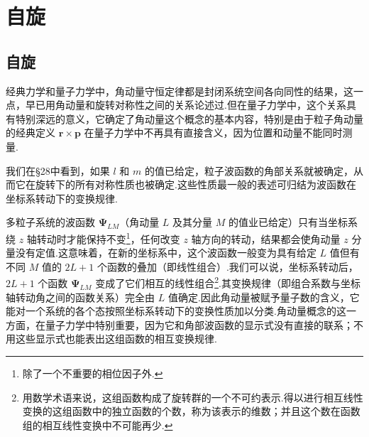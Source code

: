 %
\chapter{自旋}

\section{自旋}

经典力学和量子力学中，角动量守恒定律都是封闭系统空间各向同性的结果，这一点，早已用角动量和旋转对称性之间的关系论述过.但在量子力学中，这个关系具有特别深远的意义，它确定了角动量这个概念的基本内容，特别是由于粒子角动量的经典定义 $\boldsymbol{r}\times\boldsymbol{p}$ 在量子力学中不再具有直接含义，因为位置和动量不能同时测量.

我们在§28中看到，如果 $l$ 和 $m$ 的值已给定，粒子波函数的角部关系就被确定，从而它在旋转下的所有对称性质也被确定.这些性质最一般的表述可归结为波函数在坐标系转动下的变换规律.

多粒子系统的波函数 $\boldsymbol{\Psi}_{LM}$（角动量 $L$ 及其分量 $M$ 的值业已给定）只有当坐标系绕 $z$ 轴转动时才能保持不变\footnote{除了一个不重要的相位因子外.}，任何改变 $z$ 轴方向的转动，结果都会使角动量 $z$ 分量没有定值.这意味着，在新的坐标系中，这个波函数一般变为具有给定 $L$ 值但有不同 $M$ 值的 $2L+1$ 个函数的叠加（即线性组合）.我们可以说，坐标系转动后，$2L+1$ 个函数 $\boldsymbol{\Psi}_{LM}$ 变成了它们相互的线性组合\footnote{用数学术语来说，这组函数构成了旋转群的一个不可约表示.得以进行相互线性变换的这组函数中的独立函数的个数，称为该表示的维数；并且这个数在函数组的相互线性变换中不可能再少.}.其变换规律（即组合系数与坐标轴转动角之间的函数关系）完全由 $L$ 值确定.因此角动量被赋予量子数的含义，它能对一个系统的各个态按照坐标系转动下的变换性质加以分类.角动量概念的这一方面，在量子力学中特别重要，因为它和角部波函数的显示式没有直接的联系；不用这些显示式也能表出这组函数的相互变换规律.

